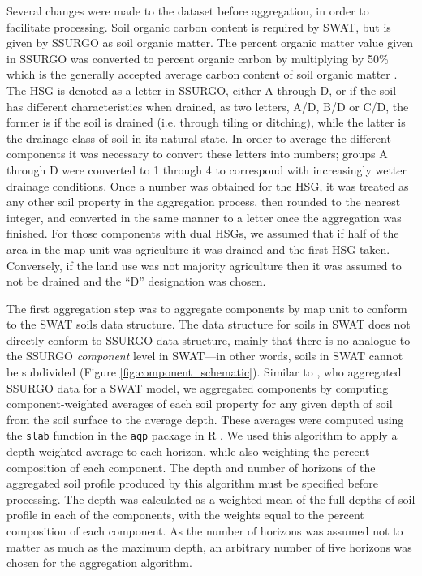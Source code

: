 Several changes were made to the dataset before aggregation, in order to
facilitate processing. Soil organic carbon content is required by SWAT, but is
given by SSURGO as soil organic matter. The percent organic matter value given in SSURGO
was converted to percent organic carbon by multiplying by 50\% which is the generally accepted average carbon content of soil organic matter \citep{brady_elements_2004}. 
The HSG is denoted as a letter in SSURGO, either A through D, or if the soil has different characteristics when drained,
as two letters, A/D, B/D or C/D, the former is if the soil is drained (i.e. through tiling or ditching), 
while the latter is the drainage class of soil in its natural state.
In order to average the different components it was necessary to convert these letters
into numbers; groups A through D were converted to 1 through 4 to correspond
with increasingly wetter drainage conditions. Once a number was obtained for the
HSG, it was treated as any other soil property in the aggregation process,
then rounded to the nearest integer, and converted in the same manner to a letter
once the aggregation was finished. For those components with dual HSGs, we
assumed that if half of the area in the map unit was agriculture it was drained
and the first HSG taken. Conversely, if the land use was not majority agriculture
then it was assumed to not be drained and the ``D'' designation was chosen.

The first aggregation step was to aggregate components by map unit to conform to
the SWAT soils data structure. The data structure for soils in SWAT does not
directly conform to SSURGO data structure, mainly that there is no analogue to the
SSURGO \textit{component} level in SWAT---in other words, soils in SWAT cannot
be subdivided (Figure \ref{fig:component_schematic}). 
Similar to \citet{gatzke_aggregation_2011}, who aggregated SSURGO data for a SWAT model, 
we aggregated components by computing
component-weighted averages of each soil property for any given depth of soil from the soil surface to the average depth.
These averages were computed using the \texttt{slab} function in the \texttt{aqp} package in R \citep{beaudette_algorithms_2013}. We
used this algorithm to apply a depth weighted average to each horizon, while
also weighting the percent composition of each component. The depth and number of horizons of
the aggregated soil profile produced by this algorithm must be specified before
processing. The depth was calculated as a weighted mean of the full depths of
soil profile in each of the components, with the weights equal to the percent composition of each
component. As the number of horizons was assumed not to matter as much as the
maximum depth, an arbitrary number of five horizons was chosen for the
aggregation algorithm.

